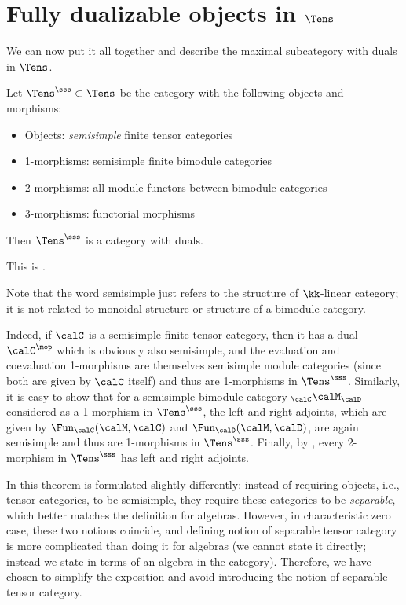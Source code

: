\section{Fully dualizable objects in $\Tens$}\label{s:tens-dualizable}
We can now put it all together and describe the maximal subcategory with duals
in $\Tens$.

\begin{theorem}\label{t:tens-dualizable}
  Let $\Tens^\sss\subset \Tens$ be the category with the following objects and
  morphisms:
  \begin{itemize}
    \item Objects: \emph{semisimple} finite tensor categories
    \item 1-morphisms: semisimple finite bimodule categories
    \item 2-morphisms: all module functors between bimodule categories
    \item 3-morphisms: functorial morphisms
  \end{itemize}
  Then $\Tens^\sss$ is a category with duals.
\end{theorem}
This is \cite[Proposition 3.4.3]{dsps-dualizable}.

Note that the word semisimple just refers to the structure of $\kk$-linear
category; it is not related to monoidal structure or structure of a bimodule
category.

Indeed, if $\calC$ is a semisimple finite tensor category, then it has a dual
$\calC^\mop$ which is obviously also semisimple, and the evaluation and
coevaluation 1-morphisms are themselves semisimple module categories (since both
are given by $\calC$ itself) and thus are 1-morphisms in $\Tens^\sss$.
Similarly, it is easy to show that for a semisimple bimodule category
${}_\calC\calM_\calD$ considered as a 1-morphism in $\Tens^\sss$, the left and
right adjoints, which are given by $\Fun_\calC(\calM, \calC)$ and
$\Fun_\calD(\calM, \calD)$, are again semisimple and thus are 1-morphisms in
$\Tens^\sss$. Finally, by , every 2-morphism in
$\Tens^\sss$ has left and right adjoints.


\begin{remark}
  In \cite{dsps-dualizable} this theorem is formulated slightly differently:
  instead of requiring objects, i.e., tensor categories, to be semisimple, they
  require these categories to be \emph{separable}, which better matches the definition for algebras.
  However, in characteristic zero case, these two notions coincide, and defining
  notion of separable tensor category is more complicated than doing it for
  algebras (we cannot state it directly; instead we state in terms of an algebra
  in the category). Therefore, we have chosen to simplify the exposition and
  avoid introducing the notion of separable tensor category.
\end{remark}

